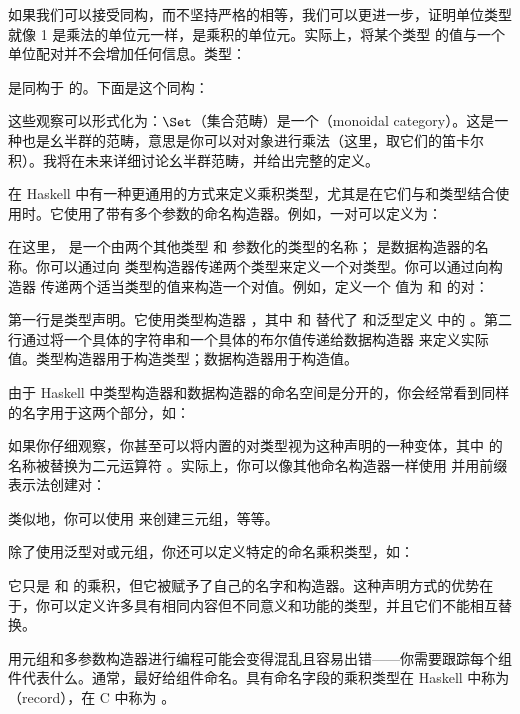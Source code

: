 如果我们可以接受同构，而不坚持严格的相等，我们可以更进一步，证明单位类型 \code{()} 就像 1 是乘法的单位元一样，是乘积的单位元。实际上，将某个类型  的值与一个单位配对并不会增加任何信息。类型：

是同构于  的。下面是这个同构：


这些观察可以形式化为：$\Set$（集合范畴）是一个（monoidal category）。这是一种也是幺半群的范畴，意思是你可以对对象进行乘法（这里，取它们的笛卡尔积）。我将在未来详细讨论幺半群范畴，并给出完整的定义。

在 Haskell 中有一种更通用的方式来定义乘积类型，尤其是在它们与和类型结合使用时。它使用了带有多个参数的命名构造器。例如，一对可以定义为：

在这里， 是一个由两个其他类型  和  参数化的类型的名称； 是数据构造器的名称。你可以通过向  类型构造器传递两个类型来定义一个对类型。你可以通过向构造器  传递两个适当类型的值来构造一个对值。例如，定义一个  值为  和  的对：

第一行是类型声明。它使用类型构造器 ，其中  和  替代了  和泛型定义  中的 。第二行通过将一个具体的字符串和一个具体的布尔值传递给数据构造器  来定义实际值。类型构造器用于构造类型；数据构造器用于构造值。

由于 Haskell 中类型构造器和数据构造器的命名空间是分开的，你会经常看到同样的名字用于这两个部分，如：

如果你仔细观察，你甚至可以将内置的对类型视为这种声明的一种变体，其中  的名称被替换为二元运算符 \code{(,)}。实际上，你可以像其他命名构造器一样使用 \code{(,)} 并用前缀表示法创建对：

类似地，你可以使用 \code{(,,)} 来创建三元组，等等。

除了使用泛型对或元组，你还可以定义特定的命名乘积类型，如：

它只是  和  的乘积，但它被赋予了自己的名字和构造器。这种声明方式的优势在于，你可以定义许多具有相同内容但不同意义和功能的类型，并且它们不能相互替换。

用元组和多参数构造器进行编程可能会变得混乱且容易出错——你需要跟踪每个组件代表什么。通常，最好给组件命名。具有命名字段的乘积类型在 Haskell 中称为（record），在 C 中称为 。

